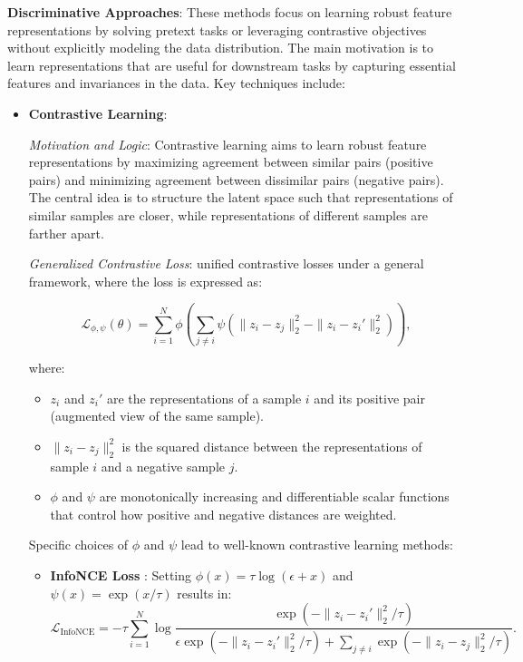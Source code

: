\begin{itemize}
\begin{itemize}
    \end{itemize}


\textbf{Discriminative Approaches}: These methods focus on learning robust feature representations by solving pretext tasks or leveraging contrastive objectives without explicitly modeling the data distribution. The main motivation is to learn representations that are useful for downstream tasks by capturing essential features and invariances in the data. Key techniques include:

    \begin{itemize}
\item \textbf{Contrastive Learning}:

\emph{Motivation and Logic}: Contrastive learning aims to learn robust feature representations by maximizing agreement between similar pairs (positive pairs) and minimizing agreement between dissimilar pairs (negative pairs). The central idea is to structure the latent space such that representations of similar samples are closer, while representations of different samples are farther apart.

\emph{Generalized Contrastive Loss}: \cite{tian2022} unified contrastive losses under a general framework, where the loss is expressed as:

\[
\mathcal{L}_{\phi,\psi}(\theta) = \sum_{i=1}^{N} \phi \left( \sum_{j \neq i} \psi\left(\|z_i - z_j\|_2^2 - \|z_i - z_i'\|_2^2\right) \right),
\]

where:
\begin{itemize}
    \item \(z_i\) and \(z_i'\) are the representations of a sample \(i\) and its positive pair (augmented view of the same sample).
    \item \(\|z_i - z_j\|_2^2\) is the squared distance between the representations of sample \(i\) and a negative sample \(j\).
    \item \(\phi\) and \(\psi\) are monotonically increasing and differentiable scalar functions that control how positive and negative distances are weighted.
\end{itemize}

Specific choices of \(\phi\) and \(\psi\) lead to well-known contrastive learning methods:
\begin{itemize}
    \item \textbf{InfoNCE Loss} \citep{oord2018representation}: Setting \(\phi(x) = \tau \log(\epsilon + x)\) and \(\psi(x) = \exp(x / \tau)\) results in:
    \[
    \mathcal{L}_{\text{InfoNCE}} = -\tau \sum_{i=1}^{N} \log \frac{\exp\left(-\|z_i - z_i'\|_2^2 / \tau\right)}{\epsilon \exp\left(-\|z_i - z_i'\|_2^2 / \tau\right) + \sum_{j \neq i} \exp\left(-\|z_i - z_j\|_2^2 / \tau\right)}.
    \]


\end{itemize}
\end{itemize}
\end{itemize}
